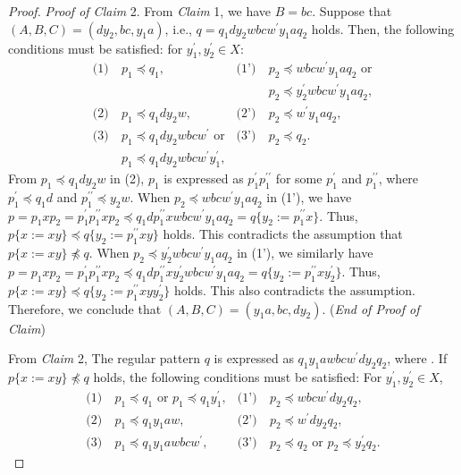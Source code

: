 \begin{proof}
  \smallskip
  \noindent
  \textit{Proof of Claim} 2.
  From \textit{Claim} 1, we have $B=bc$. Suppose that $(A, B, C) = (dy_{2}, bc, y_{1}a)$, i.e., $q = q_{1}dy_{2}wbcw^{\prime}y_{1}aq_{2} $ holds.
  Then, the following conditions must be satisfied: for $y_{1}^{\prime},y_{2}^{\prime}\in X$:
  \begin{align*}
  \textrm{(1)}~& p_{1} \preceq q_{1}, & \textrm{(1')}~& p_{2} \preceq wbcw^{\prime}y_{1}aq_{2}\mbox{ or}\\
  & & & p_{2} \preceq y_{2}^{\prime}wbcw^{\prime}y_{1}aq_{2},\\
  \textrm{(2)}~& p_{1} \preceq q_{1}dy_{2}w, & \textrm{(2')}~& p_{2} \preceq w^{\prime}y_{1}aq_{2}, \\
  \textrm{(3)}~& p_{1} \preceq q_{1}dy_{2}wbcw^{\prime}\mbox{ or} & \textrm{(3')}~& p_{2} \preceq q_{2}.\\
  & p_{1} \preceq q_{1}dy_{2}wbcw^{\prime}y_{1}^{\prime},& &
  \end{align*}
  From $p_{1} \preceq q_{1}dy_{2}w$ in (2), $p_{1}$ is expressed as $p^{\prime}_{1}p^{\prime\prime}_{1}$ for some $p^{\prime}_{1}$ and $p^{\prime\prime}_{1}$, where $p^{\prime}_{1} \preceq q_{1}d$ and $p^{\prime\prime}_{1} \preceq y_{2}w$. 
  When $p_{2} \preceq wbcw^{\prime}y_{1}aq_{2}$ in (1'), we have $p=p_{1}xp_{2}=p^{\prime}_{1}p^{\prime\prime}_{1}xp_{2} \preceq q_{1}dp^{\prime\prime}_{1}xwbcw^{\prime}y_{1}aq_{2}=q \{ y_{2}:=p^{\prime\prime}_{1}x \}$.
  Thus, $p \{ x := xy \} \preceq q \{ y_{2}:=p^{\prime\prime}_{1}xy \}$ holds.
  This contradicts the assumption that $p \{ x := xy \} \not \preceq q$.
  When $p_{2} \preceq y_{2}^{\prime}wbcw^{\prime}y_{1}aq_{2}$ in (1'), we similarly have $p=p_{1}xp_{2}=p^{\prime}_{1}p^{\prime\prime}_{1}xp_{2} \preceq q_{1}dp^{\prime\prime}_{1}xy_{2}^{\prime}wbcw^{\prime}y_{1}aq_{2}=q \{ y_{2}:=p^{\prime\prime}_{1}xy_{2}^{\prime} \}$.
  Thus, $p \{ x := xy \} \preceq q \{ y_{2}:=p^{\prime\prime}_{1}xyy_{2}^{\prime} \}$ holds.
  This also contradicts the assumption.
  Therefore, we conclude that $(A, B, C) = (y_{1}a, bc, dy_{2})$.
  (\textit{End of Proof of Claim})

  \smallskip

  From \textit{Claim} 2, The regular pattern $q$ is expressed as $q_{1}y_{1}awbcw^{\prime}dy_{2}q_{2}$, where \TheConditionA.
  If $p \{ x := xy \} \not \preceq q$ holds, the following conditions must be satisfied:
  For $y_{1}^{\prime},y_{2}^{\prime}\in X$,
  \begin{align*}
    \textrm{(1)}~& p_{1} \preceq q_{1} \mbox{ or } p_{1} \preceq q_{1}y_{1}^{\prime}, & \textrm{(1')}~& p_{2} \preceq wbcw^{\prime}dy_{2}q_{2}, \\
    \textrm{(2)}~& p_{1} \preceq q_{1}y_{1}aw, & \textrm{(2')}~& p_{2} \preceq w^{\prime}dy_{2}q_{2}, \\
    \textrm{(3)}~& p_{1} \preceq q_{1}y_{1}awbcw^{\prime}, & \textrm{(3')}~& p_{2} \preceq q_{2} \mbox{ or } p_{2} \preceq y_{2}^{\prime}q_{2}.
  \end{align*}


\end{proof}
